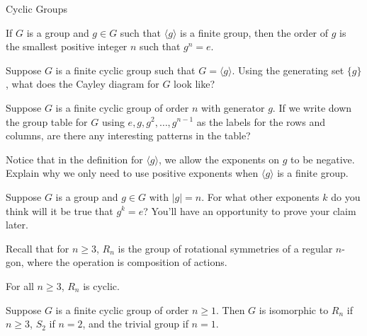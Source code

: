\begin{section}{Cyclic Groups}
\begin{corollary}\label{cor:order_smallest_exponent}
If $G$ is a group and $g\in G$ such that $\langle g\rangle$ is a finite group, then the order of $g$ is the smallest positive integer $n$ such that $g^n=e$.
\end{corollary}


\begin{problem}\label{prob:Cayley_cyclic}
Suppose $G$ is a finite cyclic group such that $G=\langle g\rangle$. Using the generating set $\{g\}$, what does the Cayley diagram for $G$ look like?
\end{problem}

\begin{problem}
Suppose $G$ is a finite cyclic group of order $n$ with generator $g$.  If we write down the group table for $G$ using $e, g, g^2, \ldots, g^{n-1}$ as the labels for the rows and columns, are there any interesting patterns in the table?
\end{problem}

\begin{problem}\label{prob:finite_pos_exps}
Notice that in the definition for $\langle g\rangle$, we allow the exponents on $g$ to be negative.  Explain why we only need to use positive exponents when $\langle g\rangle$ is a finite group.
\end{problem}

\begin{problem}\label{prob:MultiplesOfOrder}
Suppose $G$ is a group and $g\in G$ with $|g|=n$.  For what other exponents $k$ do you think will it be true that $g^k=e$? You'll have an opportunity to prove your claim later.
\end{problem}

Recall that for $n\geq3$, $R_n$ is the group of rotational symmetries of a regular $n$-gon, where the operation is composition of actions.

\begin{theorem}
For all $n\geq 3$, $R_n$ is cyclic.
\end{theorem}

\begin{theorem}\label{thm:finite_cyclic_groups}
Suppose $G$ is a finite cyclic group of order $n\geq 1$.  Then $G$ is isomorphic to $R_n$ if $n\geq 3$, $S_2$ if $n=2$, and the trivial group if $n=1$.
\end{theorem}


\end{section}
